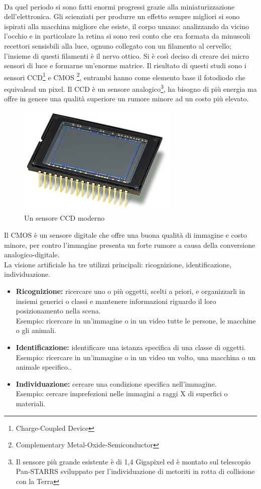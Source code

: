 \\Da quel periodo si sono fatti enormi progressi grazie alla miniaturizzazione 
dell'elettronica. Gli scienziati per produrre un effetto sempre migliori si sono
ispirati alla macchina migliore che esiste, il corpo umano: analizzando da vicino
l'occhio e in particolare la retina si sono resi conto che era formata da minuscoli 
recettori sensisbili alla luce, ognuno collegato con un filamento al cervello; 
l'insieme di questi filamenti è il nervo ottico. Si è così deciso di creare dei 
micro sensori di luce e formarne un'enorme matrice. Il risultato di questi studi
sono i sensori CCD\footnote{Charge-Coupled Device} e CMOS
\footnote{Complementary Metal-Oxide-Semiconductor}, entrambi hanno come elemento 
base il fotodiodo che equivalead  un pixel. Il CCD è un sensore 
analogico\footnote{Il sensore più grande esistente è di 1,4 Gigapixel ed è 
montato sul telescopio Pan-STARRS sviluppato per l'individuazione di metoriti in
 rotta di collisione con la Terra}, ha bisogno di più energia 
ma offre in genere una qualità superiore un rumore minore ad un costo più elevato.
 \begin{figure}[!htb] \center
\includegraphics{immagini/ccd.png}
\caption{Un sensore CCD moderno} 
\end{figure}
Il CMOS è un sensore digitale che offre una buona qualità di immagine e costo minore,
per contro l'immagine presenta un forte rumore a causa della conversione 
analogico-digitale.\\
La visione artificiale ha tre utilizzi principali: ricognizione, identificazione, 
individuazione.
\begin{itemize}
\item \textbf{Ricognizione:} ricercare uno o più oggetti, scelti a priori, e organizzarli in 
insiemi generici o classi e mantenere informazioni riguardo il loro posizionamento 
nella scena. \\Esempio: ricercare in un'immagine o in un video tutte le persone, 
le macchine o gli animali. 
\item \textbf{Identificazione:} identificare una istanza specifica di una classe 
di oggetti. \\Esempio: ricercare in un'immagine o in un video un volto, 
una macchina o un animale specifico.. 
\item \textbf{Individuazione:} cercare una condizione specifica nell'immagine. 
\\Esempio: cercare imprefezioni nelle immagini a raggi X di superfici o materiali.
\end{itemize}
